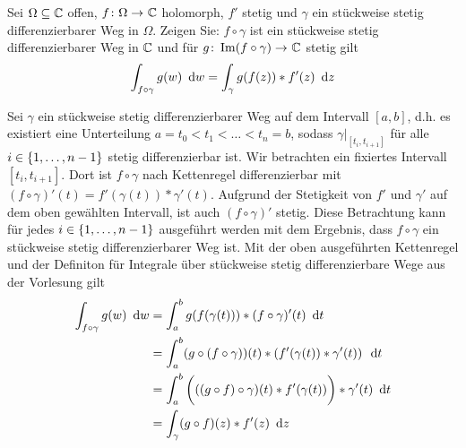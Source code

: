 \begin{exercisePage}
	\begin{task}
		Sei $\Omega \subseteq \mathbb{C}$ offen, $\abb{f}{\Omega}{\CC}$ holomorph, $f'$ stetig und $\gamma$ ein stückweise stetig differenzierbarer Weg in $\Omega$. Zeigen Sie: $f \circ \gamma$ ist ein stückweise stetig differenzierbarer Weg in $\mathbb{C}$ und für $\abb{g}{\Image (f \circ \gamma)}{\CC}$ stetig gilt
		\begin{equation*}
			\int_{f \circ \gamma} g(w) \enskip \mathrm{d}w = \int_\gamma g(f(z)) * f'(z) \enskip \mathrm{d}z
		\end{equation*}
	\end{task}
	Sei $\gamma$ ein stückweise stetig differenzierbarer Weg auf dem Intervall $[a,b]$, d.h. es existiert eine Unterteilung $a = t_0 < t_1 < \dots < t_n = b$, sodass $\gamma|_{[t_i, t_{i+1}]}$ für alle $i \in \left\{ 1, \dots, n-1 \right\}$ stetig differenzierbar ist. Wir betrachten ein fixiertes Intervall $[t_i, t_{i+1}]$. Dort ist $f \circ \gamma$ nach Kettenregel differenzierbar mit $(f \circ \gamma)'(t) = f'(\gamma(t)) * \gamma'(t)$. Aufgrund der Stetigkeit von $f'$ und $\gamma'$ auf dem oben gewählten Intervall, ist auch $(f \circ \gamma)'$ stetig. Diese Betrachtung kann für jedes $i \in \left\{ 1, \dots, n-1 \right\}$ ausgeführt werden mit dem Ergebnis, dass $f \circ \gamma$ ein stückweise stetig differenzierbarer Weg ist. 
	Mit der oben ausgeführten Kettenregel und der Definiton für Integrale über stückweise stetig differenzierbare Wege aus der Vorlesung gilt
	\begin{align*}
		\int_{f \circ \gamma} g(w) \enskip \mathrm{d}w 
		&= \int_a^b g(f(\gamma(t))) * (f \circ \gamma)'(t) \enskip \mathrm{d}t \\
		&= \int_a^b (g \circ (f \circ \gamma))(t) * \left( f'(\gamma(t)) * \gamma'(t) \right) \enskip \mathrm{d}t \\
		&= \int_a^b \bigg( ((g \circ f)\circ \gamma)(t) * f'(\gamma(t)) \bigg) * \gamma'(t) \enskip \mathrm{d}t \\
		&= \int_\gamma (g \circ f)(z) * f'(z) \enskip \mathrm{d}z
	\end{align*}
	

\end{exercisePage}
